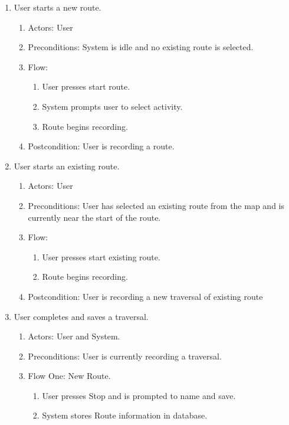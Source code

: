 \documentclass{article}
\begin{document}
\begin{enumerate}
\item User starts a new route.
    \begin{enumerate}
        \item Actors: User
        \item Preconditions: System is idle and no existing route is selected.
        \item Flow:
            \begin{enumerate}
                \item User presses start route.
                \item System prompts user to select activity.
                \item Route begins recording.
            \end{enumerate}
        \item Postcondition: User is recording a route.
    \end{enumerate}
\item User starts an existing route.
    \begin{enumerate}
        \item Actors: User
        \item Preconditions: User has selected an existing route from the map and is currently near the start of the route.
        \item Flow:
            \begin{enumerate}
                \item User presses start existing route.
                \item Route begins recording.
            \end{enumerate}
        \item Postcondition: User is recording a new traversal of existing route
    \end{enumerate}
\item User completes and saves a traversal.
    \begin{enumerate}
        \item Actors: User and System.
        \item Preconditions: User is currently recording a traversal.
        \item Flow One: New Route.
            \begin{enumerate}
            \item User presses Stop and is prompted to name and save.
            \item System stores Route information in database.

\end{enumerate}
\end{enumerate}
\end{enumerate}
\end{document}
